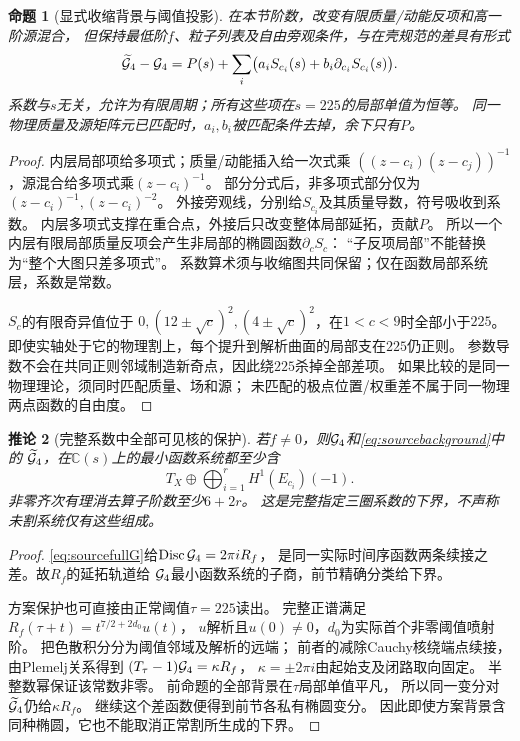 \documentclass[11pt,a4paper]{ctexart}
\theoremstyle{cnplain}\newtheorem{theorem}{定理}[section]
\newtheorem{proposition}[theorem]{命题}
\newtheorem{corollary}[theorem]{推论}
\theoremstyle{definition}\newtheorem{definition}[theorem]{定义}
\theoremstyle{remark}\newtheorem{remark}[theorem]{注}
\begin{document}
\begin{proposition}[显式收缩背景与阈值投影]\label{prop:sourceforestbackground}
在本节阶数，改变有限质量/动能反项和高一阶源混合，
但保持最低阶$f$、粒子列表及自由旁观条件，与在壳规范的差具有形式
\begin{equation}\label{eq:sourcebackground}
 \widetilde{\cal G}_4-{\cal G}_4
 =P(s)+\sum_i\bigl(a_i S_{c_i}(s)+b_i\partial_{c_i}S_{c_i}(s)\bigr).
\end{equation}
系数与$s$无关，允许为有限周期；所有这些项在$s=225$的局部单值为恒等。
同一物理质量及源矩阵元已匹配时，$a_i,b_i$被匹配条件去掉，余下只有$P$。
\end{proposition}
\begin{proof}
内层局部项给多项式；质量/动能插入给一次式乘
$((z-c_i)(z-c_j))^{-1}$，源混合给多项式乘$(z-c_i)^{-1}$。
部分分式后，非多项式部分仅为$(z-c_i)^{-1},(z-c_i)^{-2}$。
外接旁观线，分别给$S_{c_i}$及其质量导数，符号吸收到系数。
内层多项式支撑在重合点，外接后只改变整体局部延拓，贡献$P$。
所以一个内层有限局部质量反项会产生非局部的椭圆函数$\partial_cS_c$：
“子反项局部”不能替换为“整个大图只差多项式”。
系数算术须与收缩图共同保留；仅在函数局部系统层，系数是常数。

$S_c$的有限奇异值位于
$0,(12\pm\sqrt c)^2,(4\pm\sqrt c)^2$，在$1<c<9$时全部小于$225$。
即使实轴处于它的物理割上，每个提升到解析曲面的局部支在$225$仍正则。
参数导数不会在共同正则邻域制造新奇点，因此绕$225$杀掉全部差项。
如果比较的是同一物理理论，须同时匹配质量、场和源；
未匹配的极点位置/权重差不属于同一物理两点函数的自由度。
\end{proof}

\begin{corollary}[完整系数中全部可见核的保护]\label{cor:sourcevisible}
若$f\ne0$，则$ {\cal G}_4$和\eqref{eq:sourcebackground}中的
$\widetilde{\cal G}_4$，在$\mathbb C(s)$上的最小函数系统都至少含
\[
              T_X\oplus\bigoplus_{i=1}^rH^1(E_{c_i})(-1).
\]
非零齐次有理消去算子阶数至少$6+2r$。
这是完整指定三圈系数的下界，不声称未割系统仅有这些组成。
\end{corollary}
\begin{proof}
\eqref{eq:sourcefullG}给$\operatorname{Disc}{\cal G}_4=2\pi iR_f$，
是同一实际时间序函数两条续接之差。故$R_f$的延拓轨道给
$ {\cal G}_4$最小函数系统的子商，前节精确分类给下界。

方案保护也可直接由正常阈值$\tau=225$读出。
完整正谱满足$R_f(\tau+t)=t^{7/2+2d_0}u(t)$，
$u$解析且$u(0)\ne0$，$d_0$为实际首个非零阈值喷射阶。
把色散积分分为阈值邻域及解析的远端；
前者的减除Cauchy核绕端点续接，由Plemelj关系得到
$(T_\tau-1){\cal G}_4=\kappa R_f$，
$\kappa=\pm2\pi i$由起始支及闭路取向固定。
半整数幂保证该常数非零。
前命题的全部背景在$\tau$局部单值平凡，
所以同一变分对$\widetilde{\cal G}_4$仍给$\kappa R_f$。
继续这个差函数便得到前节各私有椭圆变分。
因此即使方案背景含同种椭圆，它也不能取消正常割所生成的下界。
\end{proof}
\end{document}
